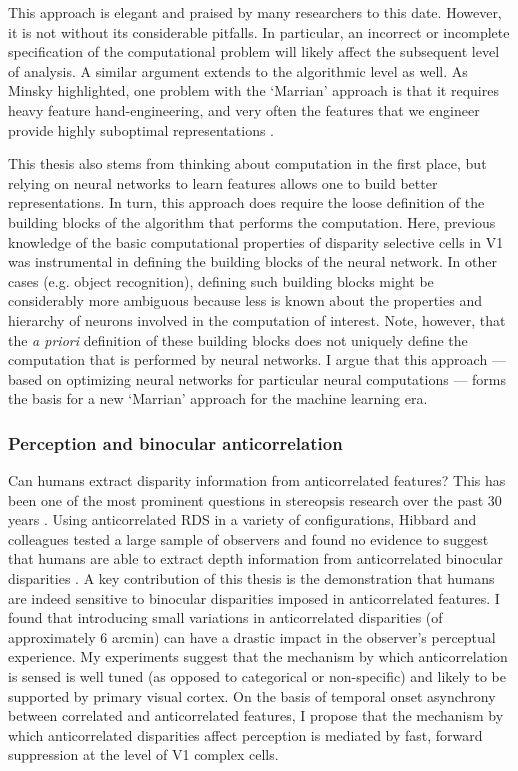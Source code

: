 This approach is elegant and praised by many researchers to this date. However, it is not without its considerable pitfalls. In particular, an incorrect or incomplete specification of the computational problem will likely affect the subsequent level of analysis. A similar argument extends to the algorithmic level as well. As Minsky highlighted, one problem with the `Marrian' approach is that it requires heavy feature hand-engineering, and very often the features that we engineer provide highly suboptimal representations \cite{Stork:1996:HLC:548366}.

This thesis also stems from thinking about computation in the first place, but relying on neural networks to learn features allows one to build better representations. In turn, this approach does require the loose definition of the building blocks of the algorithm that performs the computation. Here, previous knowledge of the basic computational properties of disparity selective cells in V1 was instrumental in defining the building blocks of the neural network. In other cases (e.g. object recognition), defining such building blocks might be considerably more ambiguous because less is known about the properties and hierarchy of neurons involved in the computation of interest. Note, however, that the \textit{a priori} definition of these building blocks does not uniquely define the computation that is performed by neural networks. I argue that this approach --- based on optimizing neural networks for particular neural computations --- forms the basis for a new `Marrian' approach for the machine learning era.


\subsubsection*{Perception and binocular anticorrelation}

Can humans extract disparity information from anticorrelated features? This has been one of the most prominent questions in stereopsis research over the past 30 years \cite{JULESZ:1964ff,Cogan:1993yr,Cumming:1998ib,Read:2000kx}. Using anticorrelated RDS in a variety of configurations, Hibbard and colleagues tested a large sample of observers and found no evidence to suggest that humans are able to extract depth information from anticorrelated binocular disparities \cite{Hibbard2014}. A key contribution of this thesis is the demonstration that humans are indeed sensitive to binocular disparities imposed in anticorrelated features. I found that introducing small variations in anticorrelated disparities (of approximately 6 arcmin) can have a drastic impact in the observer's perceptual experience. My experiments suggest that the mechanism by which anticorrelation is sensed is well tuned (as opposed to categorical or non-specific) and likely to be supported by primary visual cortex. On the basis of temporal onset asynchrony between correlated and anticorrelated features, I propose that the mechanism by which anticorrelated disparities affect perception is mediated by fast, forward suppression at the level of V1 complex cells.

